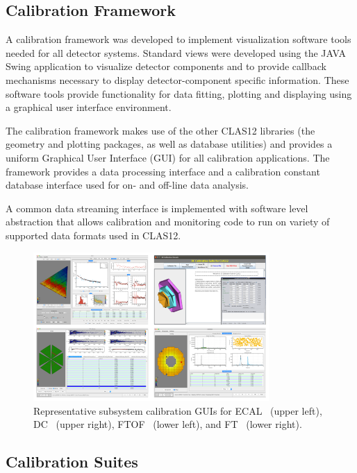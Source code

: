 \documentclass[3p,times,twocolumn]{elsarticle}
\begin{document}
\subsection{Calibration Framework}

A calibration framework was developed to implement visualization software tools needed for all detector
systems. Standard views were developed using the JAVA Swing application to visualize detector components and to provide callback
mechanisms necessary to display detector-component specific information.  These software tools provide
functionality for data fitting, plotting and displaying using a graphical user interface environment.

The calibration framework makes use of the other CLAS12 libraries
(the geometry and plotting packages, as well as database utilities) and provides a uniform Graphical User
Interface (GUI) for all calibration applications. The framework provides a data processing interface
and a calibration constant database interface used
for on- and off-line data analysis.

A common data streaming interface is implemented with software level abstraction that allows calibration and monitoring
code to run on variety of supported data formats used in CLAS12.

\begin{figure}
\centering
\includegraphics[width=0.8\textwidth]{pics/suites.png}
\caption{Representative subsystem calibration GUIs for ECAL~\cite{ecal-nim} (upper left),
DC~\cite{dc-nim} (upper right), FTOF~\cite{ftof-nim} (lower left),  and FT~\cite{ft-nim} (lower right).}
\label{suites}
\end{figure}

\subsection{Calibration Suites}
\end{document}
